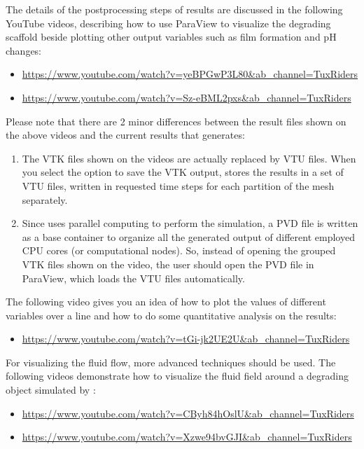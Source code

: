 The details of the postprocessing steps of \biodeg{} results are discussed in the following YouTube videos, describing how to use ParaView to visualize the degrading scaffold beside plotting other output variables such as film formation and pH changes:

\begin{itemize}
\item 
\url{https://www.youtube.com/watch?v=yeBPGwP3L80&ab_channel=TuxRiders}
\item
\url{https://www.youtube.com/watch?v=Sz-eBML2pxs&ab_channel=TuxRiders}
\end{itemize}

Please note that there are 2 minor differences between the result files shown on the above videos and the current results that \biodeg{} generates:

\begin{enumerate}
\item
The VTK files shown on the videos are actually replaced by VTU files. When you select the option to save the VTK output, \biodeg{} stores the results in a set of VTU files, written in requested time steps for each partition of the mesh separately. 
\item
Since \biodeg{} uses parallel computing to perform the simulation, a PVD file is written as a base container to organize all the generated output of different employed CPU cores (or computational nodes). So, instead of opening the grouped VTK files shown on the video, the user should open the PVD file in ParaView, which loads the VTU files automatically. 
\end{enumerate}

The following video gives you an idea of how to plot the values of different variables over a line and how to do some quantitative analysis on the results:

\begin{itemize}
\item 
\url{https://www.youtube.com/watch?v=tGi-jk2UE2U&ab_channel=TuxRiders}
\end{itemize}

For visualizing the fluid flow, more advanced techniques should be used. The following videos demonstrate how to visualize the fluid field around a degrading object simulated by \biodeg{}:

\begin{itemize}
\item
\url{https://www.youtube.com/watch?v=CByh84hOslU&ab_channel=TuxRiders}
\item
\url{https://www.youtube.com/watch?v=Xzwe94bvGJI&ab_channel=TuxRiders}
\end{itemize}